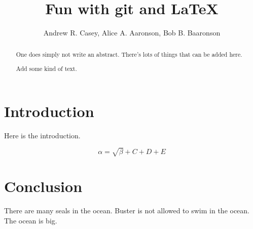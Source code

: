 \documentclass{article}
\begin{document}
\title{Fun with git and \LaTeX{}}
\author{Andrew R. Casey, Alice A. Aaronson, Bob B. Baaronson}

\maketitle

\begin{abstract}
One does simply not write an abstract. There's lots of things that can be added here.

Add some kind of text.
\end{abstract}

\section{Introduction}
Here is the introduction.

\begin{equation}
    \label{simple_equation}
    \alpha = \sqrt{ \beta } + C + D + E
\end{equation}


\section{Conclusion}
There are many seals in the ocean. Buster is not allowed to swim in the ocean. The ocean is big.
\end{document}

